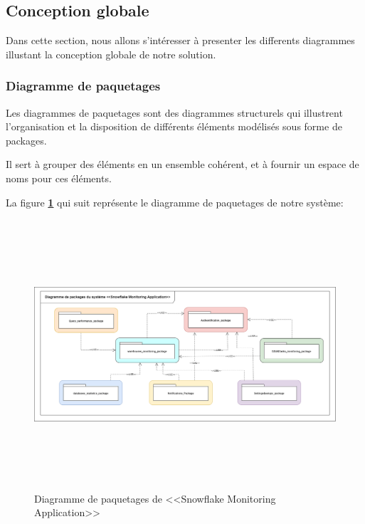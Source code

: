 \subsection{Conception globale}
    \par Dans cette section, nous allons s'intéresser à presenter les differents diagrammes illustant la conception globale de notre solution.
    \subsubsection{Diagramme de paquetages}
    \par Les diagrammes de paquetages sont des diagrammes structurels qui illustrent l'organisation et la disposition de différents éléments modélisés sous forme de packages\cite{diag_pack}.

    \par Il sert à grouper des éléments en un ensemble cohérent, et à fournir un espace de noms pour ces éléments.\par La figure \textbf{\ref{fig:e_a}} qui suit représente le diagramme de paquetages de notre système: 
            \begin{figure}[H]
            \centering
            \includegraphics[width =1\linewidth, height=10cm]{img/conception/diag_pack.png}
            \caption{Diagramme de paquetages de <<Snowflake Monitoring Application>>}
            \label{fig:e_a}
            \end{figure}
